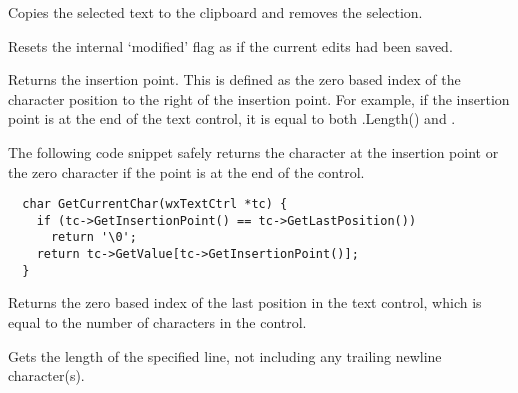 \label{wxtextctrlcut}


Copies the selected text to the clipboard and removes the selection.



Resets the internal `modified' flag as if the current edits had been saved.

\label{wxtextctrlgetinsertionpoint}


Returns the insertion point. This is defined as the zero based index of the
character position to the right of the insertion point. For example, if
the insertion point is at the end of the text control, it is equal to
both .Length() and
.

The following code snippet safely returns the character at the insertion
point or the zero character if the point is at the end of the control.

{\small%
\begin{verbatim}
  char GetCurrentChar(wxTextCtrl *tc) {
    if (tc->GetInsertionPoint() == tc->GetLastPosition())
      return '\0';
    return tc->GetValue[tc->GetInsertionPoint()];
  }
\end{verbatim}
}%

\label{wxtextctrlgetlastposition}


Returns the zero based index of the last position in the text control,
which is equal to the number of characters in the control.

\label{wxtextctrlgetlinelength}


Gets the length of the specified line, not including any trailing newline
character(s).




